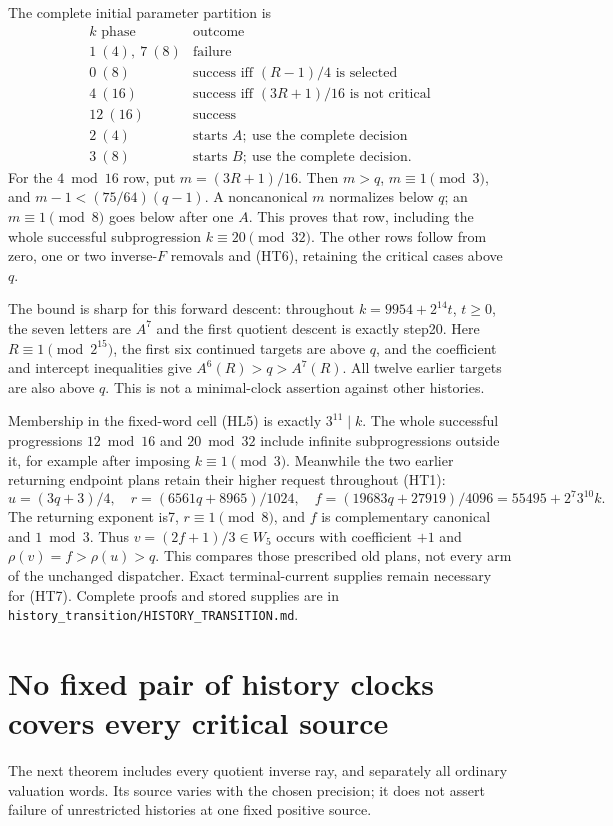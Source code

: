 \documentclass[11pt]{article}
\begin{document}
The complete initial parameter partition is
\[
\begin{array}{c|l}
 k\text{ phase}&\text{outcome}\\ \hline
 1\ (4),\ 7\ (8)&\text{failure}\\
 0\ (8)&\text{success iff }(R-1)/4\text{ is selected}\\
 4\ (16)&\text{success iff }(3R+1)/16\text{ is not critical}\\
 12\ (16)&\text{success}\\
 2\ (4)&\text{starts }A;\ \text{use the complete decision}\\
 3\ (8)&\text{starts }B;\ \text{use the complete decision}.
\end{array}
 \tag{HT9}
\]
For the $4\bmod16$ row, put $m=(3R+1)/16$. Then $m>q$,
$m\equiv1\pmod3$, and
$m-1<(75/64)(q-1)$. A noncanonical $m$ normalizes below $q$;
an $m\equiv1\pmod8$ goes below after one $A$. This proves that
row, including the whole successful subprogression $k\equiv20\pmod{32}$.
The other rows follow from zero, one or two inverse-$F$ removals
and (HT6), retaining the critical cases above $q$.

The bound is sharp for this forward descent: throughout
$k=9954+2^{14}t$, $t\ge0$, the seven letters are $A^7$ and
the first quotient descent is exactly step20. Here $R\equiv1\pmod{2^{15}}$,
the first six continued targets are above $q$, and the coefficient
and intercept inequalities give $A^6(R)>q>A^7(R)$.
All twelve earlier targets are also above $q$. This is not a
minimal-clock assertion against other histories.

Membership in the fixed-word cell (HL5) is exactly $3^{11}\mid k$.
The whole successful progressions $12\bmod16$ and $20\bmod32$
include infinite subprogressions outside it, for example after
imposing $k\equiv1\pmod3$. Meanwhile the two earlier returning
endpoint plans retain their higher request throughout (HT1):
\[
 u=(3q+3)/4,\quad r=(6561q+8965)/1024,\quad
 f=(19683q+27919)/4096=55495+2^7 3^{10}k.
\]
The returning exponent is7, $r\equiv1\pmod8$, and $f$ is
complementary canonical and $1\bmod3$. Thus
$v=(2f+1)/3\in W_5$ occurs with coefficient $+1$ and
$\rho(v)=f>\rho(u)>q$. This compares those prescribed old plans,
not every arm of the unchanged dispatcher. Exact terminal-current
supplies remain necessary for (HT7). Complete proofs and stored
supplies are in
\texttt{history\_transition/HISTORY\_TRANSITION.md}.

\section{No fixed pair of history clocks covers every critical source}
The next theorem includes every quotient inverse ray, and separately
all ordinary valuation words. Its source varies with the chosen
precision; it does not assert failure of unrestricted histories at
one fixed positive source.
\end{document}
